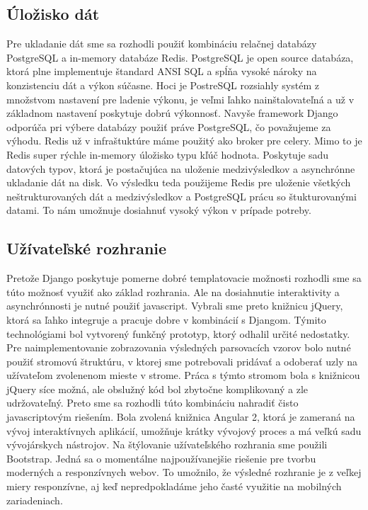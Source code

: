 \subsection{Úložisko dát}
\label{sec:store}
Pre ukladanie dát sme sa rozhodli použiť kombináciu relačnej databázy PostgreSQL a in-memory databáze Redis. PostgreSQL je open source databáza, ktorá plne implementuje štandard ANSI SQL a spĺňa vysoké nároky na konzistenciu dát a výkon súčasne. Hoci je PostreSQL  rozsiahly systém z množstvom nastavení pre ladenie výkonu, je veľmi ľahko nainštalovateľná a už v základnom nastavení poskytuje dobrú výkonnosť. Navyše framework Django odporúča pri výbere databázy použiť práve PostgreSQL, čo považujeme za výhodu. Redis už v infraštuktúre máme použitý ako broker pre celery. Mimo to je Redis super rýchle in-memory úložisko typu kľúč hodnota. Poskytuje sadu datových typov, ktorá je postačujúca na uloženie medzivýsledkov a asynchrónne ukladanie dát na disk.
Vo výsledku teda použijeme Redis pre uloženie všetkých neštrukturovaných dát a medzivýsledkov a PostgreSQL prácu so štukturovanými datami. To nám umožnuje dosiahnuť vysoký výkon v prípade potreby.

\subsection{Užívateľské rozhranie}
Pretože Django poskytuje pomerne dobré templatovacie možnosti rozhodli sme sa túto možnosť využiť ako základ rozhrania. Ale na dosiahnutie interaktivity a asynchrónnosti je nutné použiť javascript. Vybrali sme preto knižnicu jQuery, ktorá sa ľahko integruje a pracuje dobre v kombinácií s Djangom. Týmito technológiami bol vytvorený funkčný prototyp, ktorý odhalil určité nedostatky. Pre naimplementovanie zobrazovania výsledných parsovacích vzorov bolo nutné použiť stromovú štruktúru, v ktorej sme potrebovali pridávať a odoberať uzly na užívateľom zvolenenom mieste v strome. Práca s týmto stromom bola s knižnicou jQuery síce možná, ale obslužný kód bol zbytočne komplikovaný a zle udržovateľný. Preto sme sa rozhodli túto kombináciu nahradiť čisto javascriptovým riešením. Bola zvolená knižnica Angular 2, ktorá je zameraná na vývoj interaktívnych aplikácií, umožňuje krátky vývojový proces a má veľkú sadu vývojárskych nástrojov.
Na štýlovanie užívateľského rozhrania sme použili Bootstrap. Jedná sa o momentálne najpoužívanejšie riešenie pre tvorbu moderných a responzívnych webov. To umožnilo, že výsledné rozhranie je z veľkej miery responzívne, aj keď nepredpokladáme jeho časté využitie na mobilných zariadeniach.

